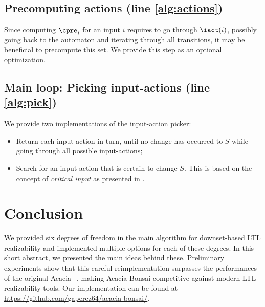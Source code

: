\documentclass[sigconf,screen,nonacm]{acmart}
\begin{document}
\subsection{Precomputing actions (line \ref{alg:actions})}

Since computing \(\cpre_i\) for an input \(i\) requires to go through
\(\iact(i)\), possibly going back to the automaton and iterating through all
transitions, it may be beneficial to precompute this set.  We provide this step
as an optional optimization.

\subsection{Main loop: Picking input-actions (line \ref{alg:pick})}

We provide two implementations of the input-action picker:
\begin{itemize}
\item Return each input-action in turn, until no change has occurred to \(S\)
  while going through all possible input-actions;
\item Search for an input-action that is certain to change \(S\).  This is based
  on the concept of \emph{critical input} as presented in \cite{...}.
\end{itemize}

\section{Conclusion}

We provided six degrees of freedom in the main algorithm for downset-based LTL
realizability and implemented multiple options for each of these degrees.  In
this short abstract, we presented the main ideas behind these.  Preliminary
experiments show that this careful reimplementation surpasses the performances
of the original Acacia+, making Acacia-Bonsai competitive against modern LTL
realizability tools.  Our implementation can be found at
\url{https://github.com/gaperez64/acacia-bonsai/}.
\end{document}
